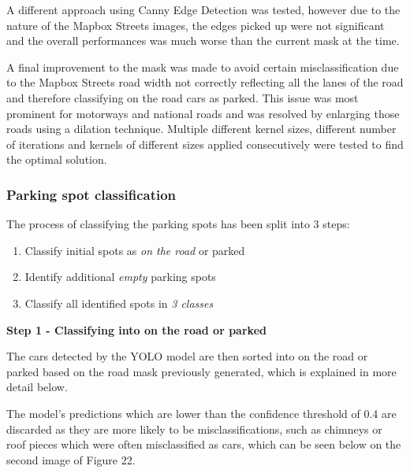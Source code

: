 A different approach using Canny Edge Detection was tested, however due to the
nature of the Mapbox Streets images, the edges picked up were not significant
and the overall performances was much worse than the current mask at the time.

A final improvement to the mask was made to avoid certain misclassification due
to the Mapbox Streets road width not correctly reflecting all the lanes of the
road and therefore classifying on the road cars as parked. This issue was most
prominent for motorways and national roads and was resolved by enlarging those
roads using a dilation technique. Multiple different kernel sizes, different
number of iterations and kernels of different sizes applied consecutively were
tested to find the optimal solution.

\newpage{}

\subsubsection{Parking spot classification}
The process of classifying the parking spots has been split into 3 steps:
\begin{enumerate}
  \item Classify initial spots as \emph{on the road} or {parked}
  \item Identify additional \emph{empty} parking spots
  \item Classify all identified spots in \emph{3 classes}
\end{enumerate}

\textbf{Step 1 - Classifying into on the road or parked}

The cars detected by the YOLO model are then sorted into on the road or parked
based on the road mask previously generated, which is explained in more detail
below.

The model's predictions which are lower than the confidence threshold of 0.4 are
discarded as they are more likely to be misclassifications, such as chimneys or
roof pieces which were often misclassified as cars, which can be seen below on
the second image of Figure 22.

